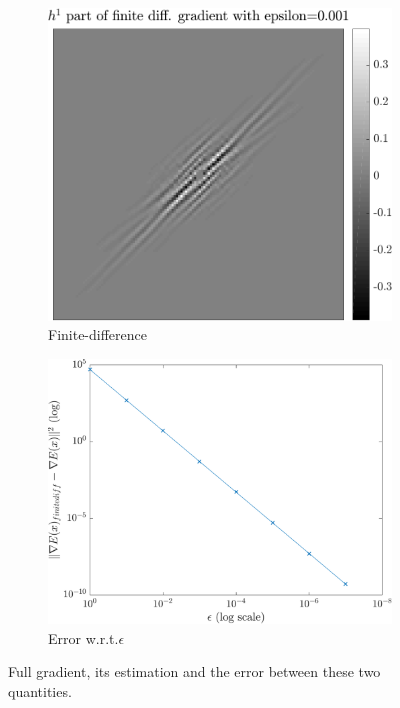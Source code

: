 \begin{figure}[!ht]
\begin{subfigure}[b]{0.30\textwidth}
\includegraphics[width=\textwidth]{figures/verif_gradient/finite-diff.pdf}
\caption{Finite-difference}\label{fig_verif_gradient-finite}
\end{subfigure}
\begin{subfigure}[b]{0.35\textwidth}\centering
\includegraphics[width=\textwidth]{figures/verif_gradient/finite-diff-vs-grad.pdf}
\caption{Error w.r.t.\@ $\epsilon$}\label{fig_verif_gradient-error}
\end{subfigure}
\caption{Full gradient, its estimation and the error between these two quantities.}\label{fig_verif_gradient}
\end{figure}

